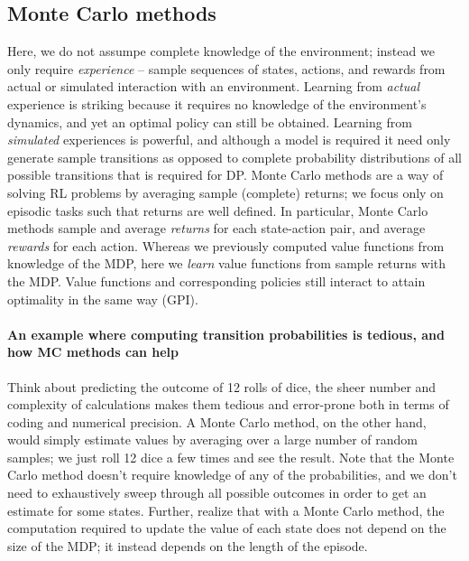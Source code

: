 \documentclass[12pt]{article}
\begin{document}
\subsection{Monte Carlo methods}
Here, we do not assumpe complete knowledge of the environment; instead we only require \emph{experience} -- sample sequences of states, actions, and rewards from actual or simulated interaction with an environment. Learning from \emph{actual} experience is striking because it requires no knowledge of the environment's dynamics, and yet an optimal policy can still be obtained. Learning from \emph{simulated} experiences is powerful, and although a model is required it need only generate sample transitions as opposed to complete probability distributions of all possible transitions that is required for DP. Monte Carlo methods are a way of solving RL problems by averaging sample (complete) returns; we focus only on episodic tasks such that returns are well defined. In particular, Monte Carlo methods sample and average \emph{returns} for each state-action pair, and average \emph{rewards} for each action. Whereas we previously computed value functions from knowledge of the MDP, here we \emph{learn} value functions from sample returns with the MDP. Value functions and corresponding policies still interact to attain optimality in the same way (GPI).

\paragraph{An example where computing transition probabilities is tedious, and how MC methods can help}
Think about predicting the outcome of 12 rolls of dice, the sheer number and complexity of calculations makes them tedious and error-prone both in terms of coding and numerical precision. A Monte Carlo method, on the other hand, would simply estimate values by averaging over a large number of random samples; we just roll 12 dice a few times and see the result. Note that the Monte Carlo method doesn't require knowledge of any of the probabilities, and we don't need to exhaustively sweep through all possible outcomes in order to get an estimate for some states. Further, realize that with a Monte Carlo method, the computation required to update the value of each state does not depend on the size of the MDP; it instead depends on the length of the episode.
\end{document}
